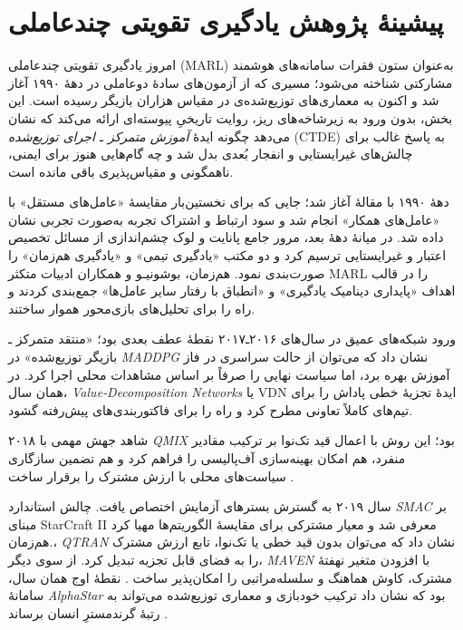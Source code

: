 \section{پیشینهٔ پژوهش یادگیری تقویتی چندعاملی}\label{sec:marl_lit}

امروز یادگیری تقویتی چندعاملی (MARL) به‌عنوان ستون فقرات سامانه‌های هوشمند مشارکتی شناخته می‌شود؛ مسیری که از آزمون‌های سادهٔ دو‌عاملی در دههٔ ۱۹۹۰ آغاز شد و اکنون به معماری‌های توزیع‌شده‌ی در مقیاس هزاران بازیگر رسیده است. این بخش، بدون ورود به زیرشاخه‌های ریز، روایت تاریخیِ پیوسته‌ای ارائه می‌کند که نشان می‌دهد چگونه ایدهٔ \emph{آموزش متمرکز ـ اجرای توزیع‌شده} (CTDE) به پاسخ غالب برای چالش‌های غیرایستایی و انفجار بُعدی بدل شد و چه گام‌هایی هنوز برای ایمنی، ناهمگونی و مقیاس‌پذیری باقی مانده است.

دههٔ ۱۹۹۰ با مقالهٔ \cite{Tan1993} آغاز شد؛ جایی که برای نخستین‌بار مقایسهٔ «عامل‌های مستقل» با «عامل‌های همکار» انجام شد و سود ارتباط و اشتراک تجربه به‌صورت تجربی نشان داده شد. در میانهٔ دههٔ بعد، مرور جامع پانایت و لوک \cite{Panait2005} چشم‌اندازی از مسائل تخصیص اعتبار و غیرایستایی ترسیم کرد و دو مکتب «یادگیری تیمی» و «یادگیری هم‌زمان» را صورت‌بندی نمود.  هم‌زمان، بوشونیـو و همکاران \cite{Busoniu2008} ادبیات متکثر MARL را در قالب اهداف «پایداری دینامیک یادگیری» و «انطباق با رفتار سایر عامل‌ها» جمع‌بندی کردند و راه را برای تحلیل‌های بازی‌محور هموار ساختند. 

ورود شبکه‌های عمیق در سال‌های ۲۰۱۶ـ۲۰۱۷ نقطهٔ عطف بعدی بود؛ «منتقد متمرکز ـ بازیگر توزیع‌شده» در \emph{MADDPG} \cite{Lowe2017} نشان داد که می‌توان از حالت سراسری در فاز آموزش بهره برد، اما سیاست نهایی را صرفاً بر اساس مشاهدات محلی اجرا کرد.  در همان سال، \emph{Value‐Decomposition Networks} یا VDN \cite{Sunehag2017} ایدهٔ تجزیهٔ خطی پاداش را برای تیم‌های کاملاً تعاونی مطرح کرد و راه را برای فاکتوربندی‌های پیش‌رفته گشود. 

۲۰۱۸ شاهد جهش مهمی با \emph{QMIX} بود؛ این روش با اعمال قید تک‌نوا بر ترکیب مقادیر منفرد، هم امکان بهینه‌سازی آف‌پالیسی را فراهم کرد و هم تضمین سازگاری سیاست‌های محلی با ارزش مشترک را برقرار ساخت \cite{Rashid2018}. 

سال ۲۰۱۹ به گسترش بسترهای آزمایش اختصاص یافت. چالش استاندارد \emph{SMAC} بر مبنای StarCraft II معرفی شد و معیار مشترکی برای مقایسهٔ الگوریتم‌ها مهیا کرد \cite{Samvelyan2019SMAC}.هم‌زمان، \emph{QTRAN} \cite{Son2019QTRAN} نشان داد که می‌توان بدون قید خطی یا تک‌نوا، تابع ارزش مشترک را به فضای قابل تجزیه تبدیل کرد. از سوی دیگر، \emph{MAVEN} با افزودن متغیر نهفتهٔ مشترک، کاوش هماهنگ و سلسله‌مراتبی را امکان‌پذیر ساخت \cite{Mahajan2019MAVEN}.  نقطهٔ اوج همان سال، سامانهٔ \emph{AlphaStar} بود که نشان داد ترکیب خودبازی و معماری توزیع‌شده می‌تواند به رتبهٔ گرندمسترِ انسان برساند \cite{Vinyals2019AlphaStar}. 

